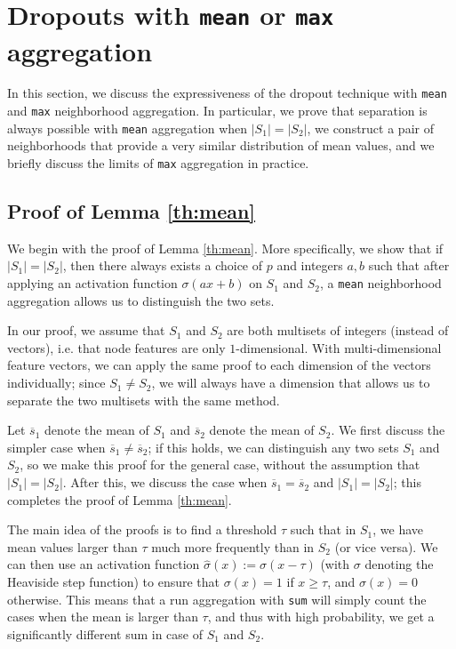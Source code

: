 \documentclass{article}
\begin{document}
\section{Dropouts with \texttt{mean} or \texttt{max} aggregation} \label{app:aggregate}

In this section, we discuss the expressiveness of the dropout technique with \texttt{mean} and \texttt{max} neighborhood aggregation. In particular, we prove that separation is always possible with \texttt{mean} aggregation when $|S_1| = |S_2|$, we construct a pair of neighborhoods that provide a very similar distribution of mean values, and we briefly discuss the limits of \texttt{max} aggregation in practice.

\subsection{Proof of Lemma \ref{th:mean}}

We begin with the proof of Lemma \ref{th:mean}. More specifically, we show that if $|S_1| = |S_2|$, then there always exists a choice of $p$ and integers $a, b$ such that after applying an activation function $\sigma(ax+b)$ on $S_1$ and $S_2$, a \texttt{mean} neighborhood aggregation allows us to distinguish the two sets.

In our proof, we assume that $S_1$ and $S_2$ are both multisets of integers (instead of vectors), i.e. that node features are only $1$-dimensional. With multi-dimensional feature vectors, we can apply the same proof to each dimension of the vectors individually; since $S_1 \neq S_2$, we will always have a dimension that allows us to separate the two multisets with the same method.

Let $\overline{s}_{1}$ denote the mean of $S_1$ and $\overline{s}_{2}$ denote the mean of $S_2$. We first discuss the simpler case when $\overline{s}_{1} \neq \overline{s}_{2}$; if this holds, we can distinguish any two sets $S_1$ and $S_2$, so we make this proof for the general case, without the assumption that $|S_1|=|S_2|$. After this, we discuss the case when $\overline{s}_{1} = \overline{s}_{2}$ and $|S_1|=|S_2|$; this completes the proof of Lemma \ref{th:mean}.

The main idea of the proofs is to find a threshold $\tau$ such that in $S_1$, we have mean values larger than $\tau$ much more frequently than in $S_2$ (or vice versa). We can then use an activation function $\hat{\sigma}(x):=\sigma(x-\tau)$ (with $\sigma$ denoting the Heaviside step function) to ensure that $\sigma(x)=1$ if $x \geq \tau$, and $\sigma(x)=0$ otherwise. This means that a run aggregation with \texttt{sum} will simply count the cases when the mean is larger than $\tau$, and thus with high probability, we get a significantly different sum in case of $S_1$ and $S_2$.
\end{document}
